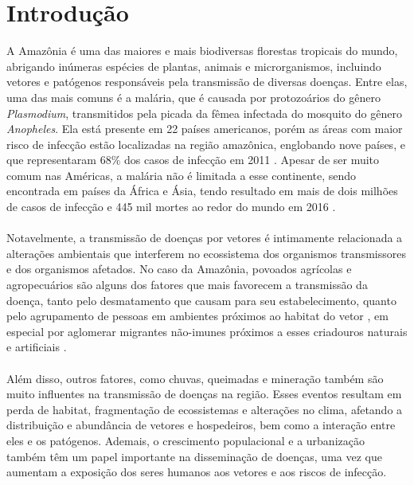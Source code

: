 \chapter{Introdução}

A Amazônia é uma das maiores e mais biodiversas florestas tropicais do mundo, 
abrigando inúmeras espécies de plantas, animais e microrganismos, incluindo 
vetores e patógenos responsáveis pela transmissão de diversas doenças. Entre 
elas, uma das mais comuns é a malária, que é causada por protozoários do 
gênero \textit{Plasmodium}, transmitidos pela picada da fêmea infectada do 
mosquito do gênero \textit{Anopheles}. Ela está presente em 22 países 
americanos, porém as áreas com maior risco de infecção estão localizadas 
na região amazônica, englobando nove países, e que representaram $68\%$ 
dos casos de infecção em 2011 \cite{pimenta_orfano_bahia_duarte_rios-velasquez_melo_pessoa_oliveira_campos_villegas_etal_2015}. Apesar de ser muito comum nas 
Américas, a malária não é limitada a esse continente, sendo encontrada 
em países da África e Ásia, tendo resultado em mais de dois milhões de 
casos de infecção e  445 mil mortes ao redor do mundo em 2016 \cite{doi:10.1146/annurev-micro-090817-062712}.    
\\\\
Notavelmente, a transmissão de doenças por vetores é intimamente relacionada 
a alterações ambientais que interferem no ecossistema dos organismos 
transmissores e dos organismos afetados. No caso da Amazônia, povoados 
agrícolas e agropecuários são alguns dos fatores que mais favorecem a 
transmissão da doença, tanto pelo desmatamento que causam para seu 
estabelecimento, quanto pelo agrupamento de pessoas em ambientes 
próximos ao habitat do vetor \cite{silva-nunes_malaria_amazon_2008}, em especial por aglomerar migrantes 
não-imunes próximos a esses criadouros naturais e artificiais \cite{DASILVANUNES2012281}. 
\\\\
Além disso, outros fatores, 
como chuvas, queimadas e mineração também são muito influentes na 
transmissão de doenças na região. Esses eventos resultam em perda 
de habitat, fragmentação de ecossistemas e alterações no clima, 
afetando a distribuição e abundância de vetores e hospedeiros, bem 
como a interação entre eles e os patógenos. Ademais, o crescimento 
populacional e a urbanização também têm um papel importante na disseminação 
de doenças, uma vez que aumentam a exposição dos seres humanos aos vetores 
e aos riscos de infecção.
\\\\
